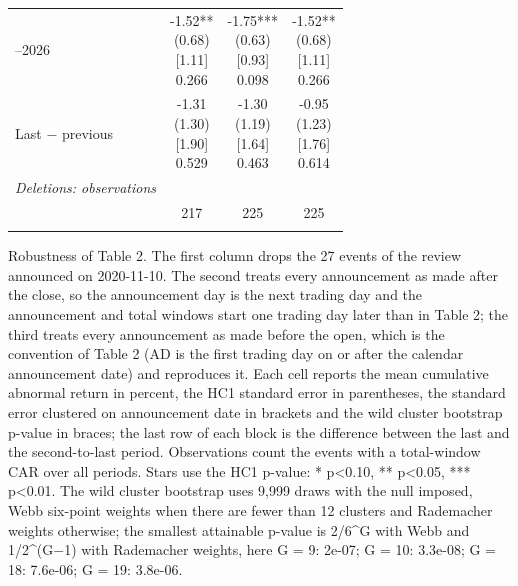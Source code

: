 \begin{threeparttable}
\begin{tabular}{@{}lccc}
\addlinespace[0.25ex]
\addlinespace[0.25ex]
2022–2026 & \makecell{-1.52**\\(0.68)\\{}[1.11]\\{0.266}} & \makecell{-1.75***\\(0.63)\\{}[0.93]\\{0.098}} & \makecell{-1.52**\\(0.68)\\{}[1.11]\\{0.266}} \\
\addlinespace[0.25ex]
\addlinespace[0.25ex]
Last $-$ previous & \makecell{-1.31\\(1.30)\\{}[1.90]\\{0.529}} & \makecell{-1.30\\(1.19)\\{}[1.64]\\{0.463}} & \makecell{-0.95\\(1.23)\\{}[1.76]\\{0.614}} \\
\addlinespace[0.25ex]
\midrule
\emph{Deletions: observations} \\
\addlinespace[0.25ex]
\addlinespace[1ex]
 & 217 & 225 & 225 \\
\addlinespace[0.25ex]
\bottomrule
\end{tabular}
\endgroup
\noindent\begin{minipage}{\linewidth}\smallskip\footnotesize
Robustness of Table 2. The first column drops the 27 events of the review announced on 2020-11-10. The second treats every announcement as made after the close, so the announcement day is the next trading day and the announcement and total windows start one trading day later than in Table 2; the third treats every announcement as made before the open, which is the convention of Table 2 (AD is the first trading day on or after the calendar announcement date) and reproduces it. Each cell reports the mean cumulative abnormal return in percent, the HC1 standard error in parentheses, the standard error clustered on announcement date in brackets and the wild cluster bootstrap p-value in braces; the last row of each block is the difference between the last and the second-to-last period. Observations count the events with a total-window CAR over all periods. Stars use the HC1 p-value: * p<0.10, ** p<0.05, *** p<0.01. The wild cluster bootstrap uses 9,999 draws with the null imposed, Webb six-point weights when there are fewer than 12 clusters and Rademacher weights otherwise; the smallest attainable p-value is 2/6\textasciicircum{}G with Webb and 1/2\textasciicircum{}(G$-$1) with Rademacher weights, here G = 9: 2e-07; G = 10: 3.3e-08; G = 18: 7.6e-06; G = 19: 3.8e-06.\end{minipage}

\end{threeparttable}